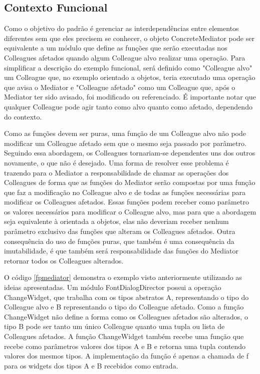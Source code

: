\subsection*{Contexto Funcional}

Como o objetivo do padrão é gerenciar as interdependências 
entre elementos diferentes sem que eles precisem se conhecer, 
o objeto ConcreteMediator pode ser equivalente a um módulo 
que define as funções que serão executadas nos Colleagues 
afetados quando algum Colleague alvo realizar uma operação. 
Para simplificar a descrição do exemplo funcional, será 
definido como "Colleague alvo" um Colleague que, no 
exemplo orientado a objetos, teria executado uma operação 
que avisa o Mediator e "Colleague afetado" como um 
Colleague que, após o Mediator ter sido avisado, foi 
modificado ou referenciado. É importante notar que qualquer 
Colleague pode agir tanto como alvo quanto como afetado, 
dependendo do contexto.

Como as funções devem ser puras, uma função de um Colleague 
alvo não pode modificar um Colleague afetado sem que o mesmo seja 
passado por parâmetro. Seguindo essa abordagem, os Colleagues 
tornariam-se dependentes uns dos outros novamente, o que não 
é desejado. Uma forma de resolver esse problema é trazendo 
para o Mediator a responsabilidade de chamar as operações 
dos Colleagues de forma que as funções do Mediator serão 
compostas por uma função que faz a modificação no Colleague alvo  
e de todas as funções necessárias para modificar os 
Colleagues afetados. Essas funções podem receber como parâmetro 
os valores necessários para modificar o Colleague alvo, 
mas para que a abordagem seja equivalente à orientada a 
objetos, elas não deveriam receber nenhum parâmetro 
exclusivo das funções que alteram os Colleagues afetados. 
Outra consequência do uso de funções puras, que também 
é uma consequência da imutabilidade, é que também será 
responsabilidade das funções do Mediator retornar todos 
os Colleagues alterados.

O código \ref{fpmediator} demonstra o exemplo visto 
anteriormente utilizando as ideias apresentadas. Um módulo 
FontDialogDirector possui a operação ChangeWidget, que 
trabalha com os tipos abstratos A, representando o tipo 
do Colleague alvo e B representando o tipo do Colleague 
afetado. Como a função ChangeWidget não define a forma 
como os Colleagues afetados são alterados, o tipo B pode 
ser tanto um único Colleague quanto uma tupla ou lista 
de Colleagues afetados. A função ChangeWidget também 
recebe uma função que recebe como parâmetros valores 
dos tipos A e B e retorna uma tupla contendo valores 
dos mesmos tipos. A implementação da função é apenas a chamada 
de f para os widgets dos tipos A e B recebidos como entrada.

